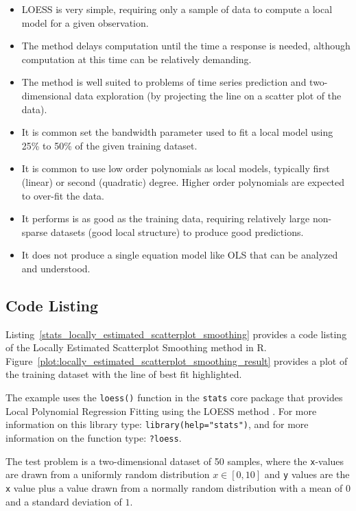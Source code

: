 \begin{itemize}
	\item LOESS is very simple, requiring only a sample of data to compute a local model for a given observation.
	\item The method delays computation until the time a response is needed, although computation at this time can be relatively demanding.
	\item The method is well suited to problems of time series prediction and two-dimensional data exploration (by projecting the line on a scatter plot of the data).
	\item It is common set the bandwidth parameter used to fit a local model using 25\% to 50\% of the given training dataset.
	\item It is common to use low order polynomials as local models, typically first (linear) or second (quadratic) degree. Higher order polynomials are expected to over-fit the data.
	\item It performs is as good as the training data, requiring relatively large non-sparse datasets (good local structure) to produce good predictions.
	\item It does not produce a single equation model like OLS that can be analyzed and understood.
\end{itemize}

\subsection{Code Listing}
Listing~\ref{stats_locally_estimated_scatterplot_smoothing} provides a code listing of the Locally Estimated Scatterplot Smoothing method in R.
Figure~\ref{plot:locally_estimated_scatterplot_smoothing_result} provides a plot of the training dataset with the line of best fit highlighted.

The example uses the \texttt{loess()} function in the \texttt{stats} core package that provides Local Polynomial Regression Fitting using the LOESS method \cite{RDCT2011a}. For more information on this library type: \texttt{library(help="stats")}, and for more information on the function type: \texttt{?loess}.

The test problem is a two-dimensional dataset of 50 samples, where the \texttt{x}-values are drawn from a uniformly random distribution $x \in [0,10]$ and \texttt{y} values are the \texttt{x} value plus a value drawn from a normally random distribution with a mean of $0$ and a standard deviation of $1$.

